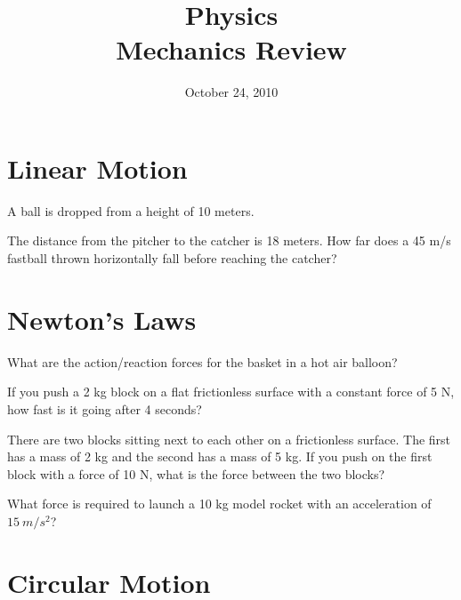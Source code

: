 \documentclass[fleqn,addpoints]{exam}
\title{Physics \\ Mechanics Review}
\date{October 24, 2010}
\begin{document}
\maketitle


\begin{questions}

\section{Linear Motion}

\question
A ball is dropped from a height of 10 meters. 

\question
The distance from the pitcher to the catcher is 18 meters.  How far does a 45 m/s fastball thrown horizontally fall
before reaching the catcher?

\section{Newton's Laws}

\question
What are the action/reaction forces for the basket in a hot air balloon?

\question
If you push a 2 kg block on a flat frictionless surface with a constant force of 5 N, how fast is it going after 4 seconds?

\question 

There are two blocks sitting next to each other on a frictionless surface.  The
first has a mass of 2 kg and the second has a mass of 5 kg.  If you push on the
first block with a force of 10 N, what is the force between the two blocks?

\question What force is required to launch a 10 kg model rocket with an
acceleration of $15 \ m/s^2$?

\section{Circular Motion}


\end{questions}
\end{document}
